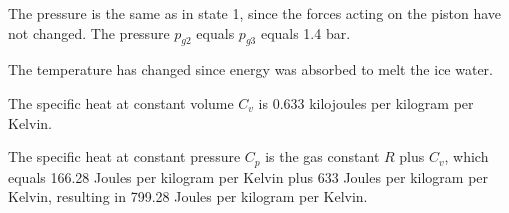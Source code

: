 The pressure is the same as in state 1, since the forces acting on the piston have not changed. The pressure \( p_{g2} \) equals \( p_{g3} \) equals 1.4 bar.

The temperature has changed since energy was absorbed to melt the ice water.

The specific heat at constant volume \( C_v \) is 0.633 kilojoules per kilogram per Kelvin.

The specific heat at constant pressure \( C_p \) is the gas constant \( R \) plus \( C_v \), which equals 166.28 Joules per kilogram per Kelvin plus 633 Joules per kilogram per Kelvin, resulting in 799.28 Joules per kilogram per Kelvin.